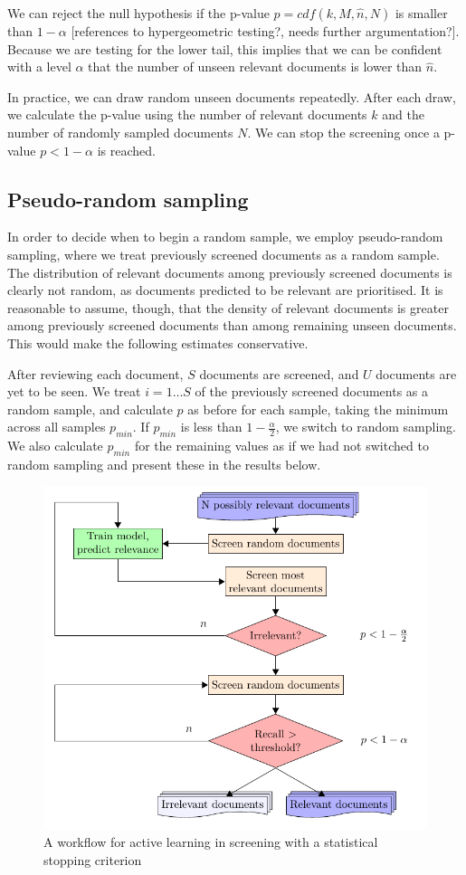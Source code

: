 \documentclass{bmcart}
\begin{document}
	We can reject the null hypothesis if the p-value $p = cdf(k,M,\hat{n},N)$ is smaller than $1 - \alpha$ [references to hypergeometric testing?, needs further argumentation?]. Because we are testing for the lower tail, this implies that we can be confident with a level $\alpha$ that the number of unseen relevant documents is lower than $\hat{n}$.
	
	In practice, we can draw random unseen documents repeatedly. After each draw, we calculate the p-value using the number of relevant documents $k$ and the number of randomly sampled documents $N$.
	We can stop the screening once a p-value $p < 1 - \alpha$ is reached.


	\subsection*{Pseudo-random sampling}
	In order to decide when to begin a random sample, we employ pseudo-random sampling, where we treat previously screened documents as a random sample. The distribution of relevant documents among previously screened documents is clearly not random, as documents predicted to be relevant are prioritised. It is reasonable to assume, though, that the density of relevant documents is greater among previously screened documents than among remaining unseen documents. This would make the following estimates conservative. 
	
	After reviewing each document, $S$ documents are screened, and $U$ documents are yet to be seen. We treat $i = 1 \dots S$ of the previously screened documents as a random sample, and calculate $p$ as before for each sample, taking the minimum across all samples $p_{min}$. If $p_{min}$ is less than $1-\frac{\alpha}{2}$, we switch to random sampling. We also calculate $p_{min}$ for the remaining values as if we had not switched to random sampling and present these in the results below.


	\medskip
	
	\begin{figure}
		\includegraphics[width=0.5\linewidth]{../images/flow}
		\caption{A workflow for active learning in screening with a statistical stopping criterion}
		\label{flow}
	\end{figure}
\end{document}
